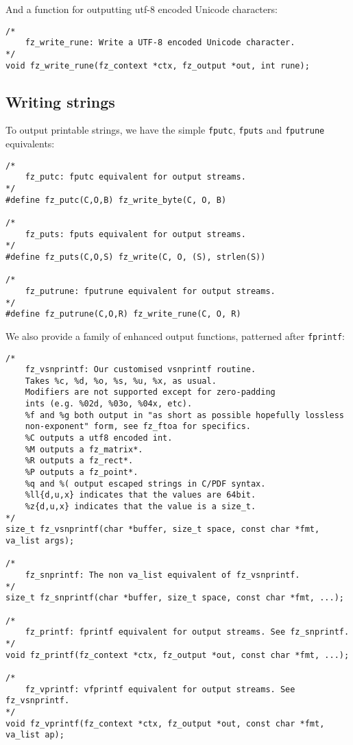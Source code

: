 \documentclass[oneside]{book}
\begin{document}
And a function for outputting utf-8 encoded Unicode characters:

\begin{lstlisting}
/*
	fz_write_rune: Write a UTF-8 encoded Unicode character.
*/
void fz_write_rune(fz_context *ctx, fz_output *out, int rune);
\end{lstlisting}

\subsection{Writing strings}

To output printable strings, we have the simple \texttt{fputc}, \texttt{fputs} and \texttt{fputrune} equivalents:

\begin{lstlisting}
/*
	fz_putc: fputc equivalent for output streams.
*/
#define fz_putc(C,O,B) fz_write_byte(C, O, B)

/*
	fz_puts: fputs equivalent for output streams.
*/
#define fz_puts(C,O,S) fz_write(C, O, (S), strlen(S))

/*
	fz_putrune: fputrune equivalent for output streams.
*/
#define fz_putrune(C,O,R) fz_write_rune(C, O, R)
\end{lstlisting}

We also provide a family of enhanced output functions, patterned after \texttt{fprintf}:

\begin{lstlisting}
/*
	fz_vsnprintf: Our customised vsnprintf routine.
	Takes %c, %d, %o, %s, %u, %x, as usual.
	Modifiers are not supported except for zero-padding
	ints (e.g. %02d, %03o, %04x, etc).
	%f and %g both output in "as short as possible hopefully lossless
	non-exponent" form, see fz_ftoa for specifics.
	%C outputs a utf8 encoded int.
	%M outputs a fz_matrix*.
	%R outputs a fz_rect*.
	%P outputs a fz_point*.
	%q and %( output escaped strings in C/PDF syntax.
	%ll{d,u,x} indicates that the values are 64bit.
	%z{d,u,x} indicates that the value is a size_t.
*/
size_t fz_vsnprintf(char *buffer, size_t space, const char *fmt, va_list args);

/*
	fz_snprintf: The non va_list equivalent of fz_vsnprintf.
*/
size_t fz_snprintf(char *buffer, size_t space, const char *fmt, ...);

/*
	fz_printf: fprintf equivalent for output streams. See fz_snprintf.
*/
void fz_printf(fz_context *ctx, fz_output *out, const char *fmt, ...);

/*
	fz_vprintf: vfprintf equivalent for output streams. See fz_vsnprintf.
*/
void fz_vprintf(fz_context *ctx, fz_output *out, const char *fmt, va_list ap);
\end{lstlisting}
\end{document}

